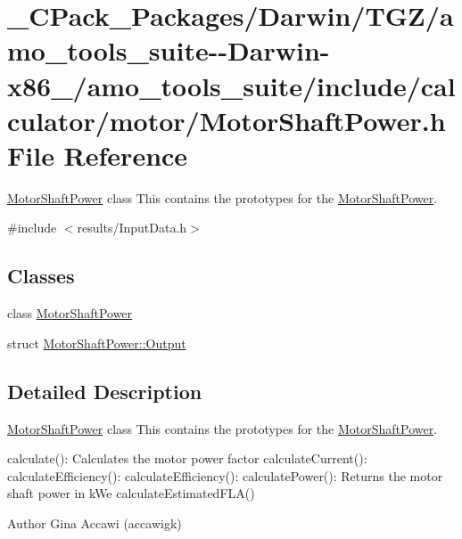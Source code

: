 \hypertarget{___c_pack___packages_2_darwin_2_t_g_z_2amo__tools__suite--_darwin-x86__64_2amo__tools__suite_2in5489e32c1364012a6c5dc7e4f7a3321f}{}\section{\+\_\+\+C\+Pack\+\_\+\+Packages/\+Darwin/\+T\+G\+Z/amo\+\_\+tools\+\_\+suite-\/-\/\+Darwin-\/x86\+\_/amo\+\_\+tools\+\_\+suite/include/calculator/motor/\+Motor\+Shaft\+Power.h File Reference}
\label{___c_pack___packages_2_darwin_2_t_g_z_2amo__tools__suite--_darwin-x86__64_2amo__tools__suite_2in5489e32c1364012a6c5dc7e4f7a3321f}


\hyperlink{class_motor_shaft_power}{Motor\+Shaft\+Power} class This contains the prototypes for the \hyperlink{class_motor_shaft_power}{Motor\+Shaft\+Power}.  


{\ttfamily \#include $<$results/\+Input\+Data.\+h$>$}\newline
\subsection*{Classes}
\begin{DoxyCompactItemize}
\item 
class \hyperlink{class_motor_shaft_power}{Motor\+Shaft\+Power}
\item 
struct \hyperlink{struct_motor_shaft_power_1_1_output}{Motor\+Shaft\+Power\+::\+Output}
\end{DoxyCompactItemize}


\subsection{Detailed Description}
\hyperlink{class_motor_shaft_power}{Motor\+Shaft\+Power} class This contains the prototypes for the \hyperlink{class_motor_shaft_power}{Motor\+Shaft\+Power}. 

calculate()\+: Calculates the motor power factor calculate\+Current()\+: calculate\+Efficiency()\+: calculate\+Efficiency()\+: calculate\+Power()\+: Returns the motor shaft power in k\+We calculate\+Estimated\+F\+L\+A()

\begin{DoxyAuthor}{Author}
Gina Accawi (accawigk) 
\end{DoxyAuthor}
